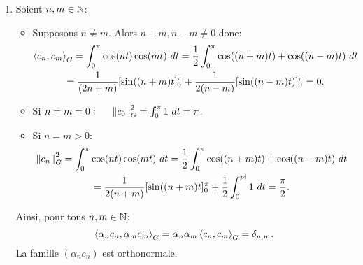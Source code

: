 \begin{enumerate}
\item Soient $n,m\in \mathbb{N}$:
\begin{itemize}
 \item[\textbullet] Supposons $n\neq m$. Alors $n+m, n-m\neq 0$ donc:
 \begin{multline*}
 \left\langle {c_{n}} , {c_{m}} \right\rangle_{G}  = \int_{0}^{\pi}\cos(nt)\cos(mt)\ dt 
  = \frac{1}{2}\int_{0}^{\pi}\cos((n+m)t) + \cos((n-m)t)\ dt\\
  = \frac{1}{(2n+m)}[\sin ((n+m)t]_{0}^{\pi} + \frac{1}{2(n-m)}[\sin((n-m)t)]_{0}^{\pi}
  = 0.
 \end{multline*}
 \item[\textbullet] Si $n=m=0: \hspace{0.5cm }\left\Vert c_{0}\right\Vert_{G}^{2} = \int_{0}^{\pi}1\ dt = \pi$.
 \item[\textbullet] Si $n=m>0$:
  \begin{multline*}
 \left\Vert c_{n}\right\Vert_{G}^{2}  = \int_{0}^{\pi}\cos(nt)\cos(mt)\ dt 
  = \frac{1}{2}\int_{0}^{\pi}\cos((n+m)t) + \cos((n-m)t)\ dt\\
  = \frac{1}{2(n+m)}[\sin ((n+m)t]_{0}^{\pi} + \frac{1}{2}\int_{0}^{pi}1\ dt
  = \frac{\pi}{2}.
 \end{multline*}
\end{itemize}

Ainsi, pour tous $n,m\in \mathbb{N}$:
$$\left\langle {\alpha_{n} c_{n}} , {\alpha_{m} c_{m}} \right\rangle_{G} = \alpha_{n}\alpha_{m}\left\langle {c_{n}} , {c_{m}} \right\rangle_{G}=\delta_{n,m}.$$
La famille $(\alpha_{n}c_{n})$ est orthonormale. 


\end{enumerate}
